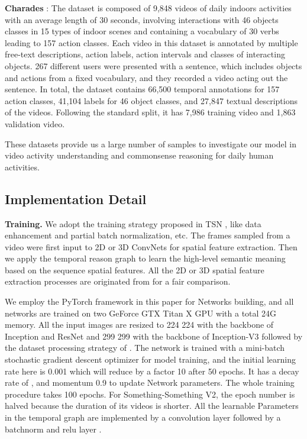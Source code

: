 \documentclass[conference,compsoc]{IEEEtran}
\begin{document}
     \textbf{Charades} \cite{sigurdsson2016hollywood}: The dataset is composed of 9,848 videos of daily indoors activities with an average length of 30 seconds, involving interactions with 46 objects classes in 15 types of indoor scenes and containing a vocabulary of 30 verbs leading to 157 action classes. Each video in this dataset is annotated by multiple free-text descriptions, action labels, action intervals and classes of interacting objects. 267 different users were presented with a sentence, which includes objects and actions from a fixed vocabulary, and they recorded a video acting out the sentence. In total, the dataset contains 66,500 temporal annotations for 157 action classes, 41,104 labels for 46 object classes, and 27,847 textual descriptions of the videos. Following the standard split, it has 7,986 training video and 1,863 validation video.
    
    These datasets provide us a large number of samples to investigate our model in video activity understanding and commonsense reasoning for daily human activities.
    
\subsection{Implementation Detail}
    \textbf{Training.} We adopt the training strategy proposed in TSN \cite{wang2016temporal}, like data enhancement and partial batch normalization, etc. The frames sampled from a video were first input to 2D or 3D ConvNets for spatial feature extraction. Then we apply the temporal reason graph to learn the high-level semantic meaning based on the sequence spatial features. All the 2D or 3D spatial feature extraction processes are originated from \cite{wang2016temporal, wang2018non, wang2018videos} for a fair comparison.
    
    We employ the PyTorch framework \cite{paszke2017automatic} in this paper for Networks building, and all networks are trained on two GeForce GTX Titan X GPU with a total 24G memory. All the input images are resized to 224  224 with the backbone of Inception \cite{ioffe2015batch} and ResNet \cite{he2016deep} and 299  299 with the backbone of Inception-V3 \cite{szegedy2016rethinking} followed by the dataset processing strategy of \cite{wang2016temporal}. The network is trained with a mini-batch stochastic gradient descent optimizer for model training, and the initial learning rate here is 0.001 which will reduce by a factor 10 after 50 epochs. It has a decay rate of , and momentum 0.9 to update Network parameters. The whole training procedure takes 100 epochs. For Something-Something V2, the epoch number is halved because the duration of its videos is shorter. All the learnable Parameters in the temporal graph are implemented by a convolution layer followed by a batchnorm \cite{ioffe2015batch} and relu layer \cite{glorot2011deep}.
    
\end{document}
